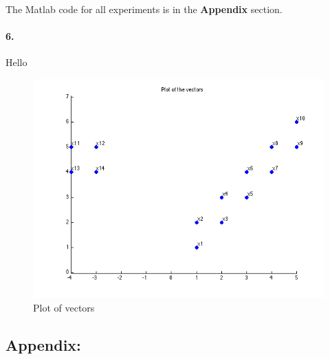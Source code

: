 \documentclass[a4paper]{article}
\begin{document}
\noindent The Matlab code for all experiments is in the \textbf{Appendix} section.

\paragraph{6.} Hello

\begin{figure}[H]
  \centering
    \includegraphics[scale=.57]{images/vectors.png}
  \caption{Plot of vectors}
  \label{fig:vectors}
\end{figure}

\newpage
\subsection*{Appendix:}
	
	
	
	
	
	
\end{document}
